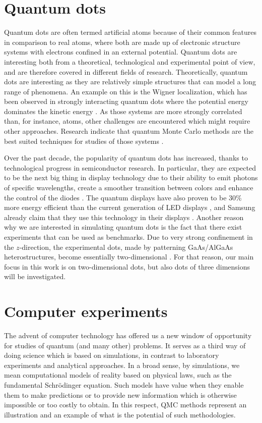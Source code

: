 \section{Quantum dots}
Quantum dots are often termed artificial atoms because of their common features in comparison to real atoms, where both are made up of electronic structure systems with electrons confined in an external potential. Quantum dots are interesting both from a theoretical, technological and experimental point of view, and are therefore covered in different fields of research. Theoretically, quantum dots are interesting as they are relatively simple structures that can model a long range of phenomena. An example on this is the Wigner localization, which has been observed in strongly interacting quantum dots where the potential energy dominates the kinetic energy \supercite{ghosal_incipient_2007, hogberget_quantum_2013}. As those systems are more strongly correlated than, for instance, atoms, other challenges are encountered which might require other approaches. Research indicate that quantum Monte Carlo methods are the best suited techniques for studies of those systems \supercite{ghosal_incipient_2007}.

Over the past decade, the popularity of quantum dots has increased, thanks to technological progress in semiconductor research. In particular, they are expected to be the next big thing in display technology due to their ability to emit photons of specific wavelengths, create a smoother transition between colors and enhance the control of the diodes \supercite{noauthor_samsung_nodate}. The quantum displays have also proven to be 30\% more energy efficient than the current generation of LED displays \supercite{manders_8.3:_2015}, and Samsung already claim that they use this technology in their displays \supercite{noauthor_samsung_nodate}. Another reason why we are interested in simulating quantum dots is the fact that there exist experiments that can be used as benchmarks. Due to very strong confinement in the $z$-direction, the experimental dots, made by patterning GaAs/AlGaAs heterostructures, become essentially two-dimensional \supercite{marzin_photoluminescence_1994,brunner_sharp-line_1994}. For that reason, our main focus in this work is on two-dimensional dots, but also dots of three dimensions will be investigated.

\section{Computer experiments}
The advent of computer technology has offered us a new window of opportunity for studies of quantum (and many other) problems. It serves as a third way of doing science which is based on simulations, in contrast to laboratory experiments and analytical approaches. In a broad sense, by simulations, we mean computational models of reality based on physical laws, such as the fundamental Schrödinger equation. Such models have value when they enable them to make predictions or to provide new information which is otherwise impossible or too costly to obtain. In this respect, QMC methods represent an illustration and an example of what is the potential of such methodologies.

